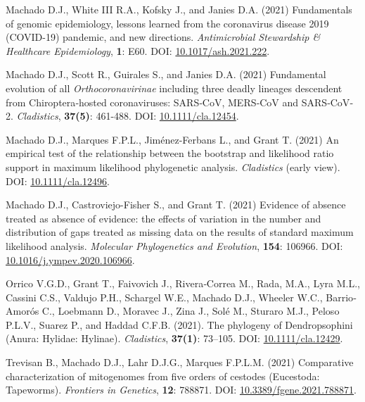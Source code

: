     {\setlength{\parskip}{.5em}\renewcommand{\baselinestretch}{2.0}\begin{hangparas}{.25in}{1}

		Machado D.J., White III R.A., Kofsky J., and Janies D.A. (2021) Fundamentals of genomic epidemiology, lessons learned from the coronavirus disease 2019 (COVID-19) pandemic, and new directions. \textit{Antimicrobial Stewardship \& Healthcare Epidemiology}, \textbf{1}: E60. DOI: \href{https://doi.org/10.1017/ash.2021.222}{10.1017/ash.2021.222}.
		
		Machado D.J., Scott R., Guirales S., and Janies D.A. (2021) Fundamental evolution of all \emph{Orthocoronavirinae} including three deadly lineages descendent from Chiroptera‐hosted coronaviruses: SARS‐CoV, MERS‐CoV and SARS‐CoV‐2. \emph{Cladistics}, \textbf{37(5)}: 461-488. DOI: \href{https://doi.org/10.1111/cla.12454}{10.1111/cla.12454}.

		Machado D.J., Marques F.P.L., Jiménez-Ferbans L., and Grant T. (2021) An empirical test of the relationship between the bootstrap and likelihood ratio support in maximum likelihood phylogenetic analysis. \textit{Cladistics} (early view). DOI: \href{https://doi.org/10.1111/cla.12496}{10.1111/cla.12496}.
		
		Machado D.J., Castroviejo-Fisher S., and Grant T. (2021) Evidence of absence treated as absence of evidence: the effects of variation in the number and distribution of gaps treated as missing data on the results of standard maximum likelihood analysis. \emph{Molecular Phylogenetics and Evolution}, \textbf{154}: 106966. DOI: \href{https://doi.org/10.1016/j.ympev.2020.106966}{10.1016/j.ympev.2020.106966}.

        Orrico V.G.D., Grant T., Faivovich J., Rivera‐Correa M., Rada, M.A., Lyra M.L., Cassini C.S., Valdujo P.H., Schargel W.E., Machado D.J., Wheeler W.C., Barrio‐Amorós C., Loebmann D., Moravec J., Zina J., Solé M., Sturaro M.J., Peloso P.L.V., Suarez P., and Haddad C.F.B. (2021). The phylogeny of Dendropsophini (Anura: Hylidae: Hylinae). \emph{Cladistics}, \textbf{37(1)}: 73–105. DOI: \href{https://doi.org/10.1111/cla.12429}{10.1111/cla.12429}.
        
        Trevisan B., Machado D.J., Lahr D.J.G., Marques F.P.L.M. (2021) Comparative characterization of mitogenomes from five orders of cestodes (Eucestoda: Tapeworms). \textit{Frontiers in Genetics}, \textbf{12}: 788871. DOI: \href{ https://doi.org/10.3389/fgene.2021.788871}{10.3389/fgene.2021.788871}.

	\end{hangparas}}

